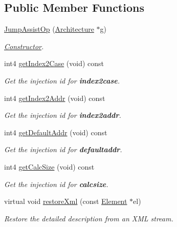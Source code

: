 \subsection*{Public Member Functions}
\begin{DoxyCompactItemize}
\item 
\mbox{\hyperlink{class_jump_assist_op_a78d4877f371694b4f9526564b29ebbe5}{Jump\+Assist\+Op}} (\mbox{\hyperlink{class_architecture}{Architecture}} $\ast$g)
\begin{DoxyCompactList}\small\item\em \mbox{\hyperlink{class_constructor}{Constructor}}. \end{DoxyCompactList}\item 
int4 \mbox{\hyperlink{class_jump_assist_op_a9bd801baba290c5a6dab5455dd1d946e}{get\+Index2\+Case}} (void) const
\begin{DoxyCompactList}\small\item\em Get the injection id for {\bfseries{index2case}}. \end{DoxyCompactList}\item 
int4 \mbox{\hyperlink{class_jump_assist_op_ae4b341a772a139b06c20f52262d35adb}{get\+Index2\+Addr}} (void) const
\begin{DoxyCompactList}\small\item\em Get the injection id for {\bfseries{index2addr}}. \end{DoxyCompactList}\item 
int4 \mbox{\hyperlink{class_jump_assist_op_a23c4ab9487662316df6ae952522bbf3d}{get\+Default\+Addr}} (void) const
\begin{DoxyCompactList}\small\item\em Get the injection id for {\bfseries{defaultaddr}}. \end{DoxyCompactList}\item 
int4 \mbox{\hyperlink{class_jump_assist_op_a9fdcdb39841863da460a5aef7d6d60df}{get\+Calc\+Size}} (void) const
\begin{DoxyCompactList}\small\item\em Get the injection id for {\bfseries{calcsize}}. \end{DoxyCompactList}\item 
virtual void \mbox{\hyperlink{class_jump_assist_op_a2e246c75988410d0fbdae74e44eb09cc}{restore\+Xml}} (const \mbox{\hyperlink{class_element}{Element}} $\ast$el)
\begin{DoxyCompactList}\small\item\em Restore the detailed description from an X\+ML stream. \end{DoxyCompactList}\end{DoxyCompactItemize}
